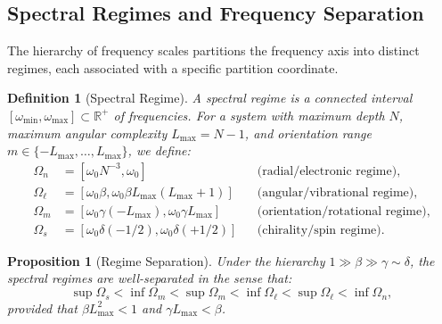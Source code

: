 \documentclass[twocolumn,10pt,a4paper]{article}
\newtheorem{proposition}[theorem]{Proposition}
\newtheorem{definition}[theorem]{Definition}
\theoremstyle{remark}
\newcommand{\Reals}{\mathbb{R}}
\begin{document}
\subsection{Spectral Regimes and Frequency Separation}

The hierarchy of frequency scales partitions the frequency axis into distinct regimes, each associated with a specific partition coordinate.

\begin{definition}[Spectral Regime]
\label{def:spectral_regime}
A \emph{spectral regime} is a connected interval $[\omega_{\min}, \omega_{\max}] \subset \Reals^+$ of frequencies. For a system with maximum depth $N$, maximum angular complexity $L_{\max} = N-1$, and orientation range $m \in \{-L_{\max}, \ldots, L_{\max}\}$, we define:
\begin{align}
\Omega_n &= [\omega_0 N^{-3}, \omega_0] && \text{(radial/electronic regime)}, \label{eq:regime_n} \\
\Omega_\ell &= [\omega_0 \beta, \omega_0 \beta L_{\max}(L_{\max}+1)] && \text{(angular/vibrational regime)}, \label{eq:regime_l} \\
\Omega_m &= [\omega_0 \gamma (-L_{\max}), \omega_0 \gamma L_{\max}] && \text{(orientation/rotational regime)}, \label{eq:regime_m} \\
\Omega_s &= [\omega_0 \delta (-1/2), \omega_0 \delta (+1/2)] && \text{(chirality/spin regime)}. \label{eq:regime_s}
\end{align}
\end{definition}

\begin{proposition}[Regime Separation]
\label{prop:regime_separation}
Under the hierarchy $1 \gg \beta \gg \gamma \sim \delta$, the spectral regimes are well-separated in the sense that:
\begin{equation}
\sup \Omega_s < \inf \Omega_m < \sup \Omega_m < \inf \Omega_\ell < \sup \Omega_\ell < \inf \Omega_n,
\end{equation}
provided that $\beta L_{\max}^2 < 1$ and $\gamma L_{\max} < \beta$.
\end{proposition}
\end{document}
